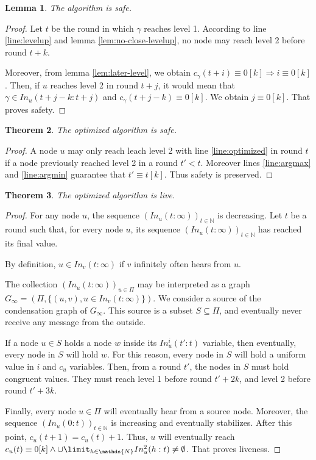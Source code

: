 \documentclass[11pt,letterpaper]{article}
\newtheorem{thm}{Theorem}
\newtheorem{lem}[thm]{Lemma}
\newcommand{\cent}{\gamma}
\begin{document}
\begin{lem}
	The algorithm is safe.
\end{lem}
\begin{proof}
	Let $t$ be the round in which $\cent$ reaches level 1.
	According to line \ref{line:levelup} and lemma \ref{lem:no-close-levelup}, no node may reach level 2 before round $t+k$.

	Moreover, from lemma \ref{lem:later-level}, we obtain $c_\cent(t+i) \equiv 0 [k] \Rightarrow i \equiv 0 [k]$.
	Then, if $u$ reaches level 2 in round $t+j$, it would mean that $\cent \in In_u(t+j-k:t+j)$ and $c_\cent(t+j-k) \equiv 0 [k]$.
	We obtain $j \equiv 0 [k]$. That proves safety.
\end{proof}

\begin{thm}
	The optimized algorithm is safe.
\end{thm}
\begin{proof}
	A node $u$ may only reach leach level 2 with line \ref{line:optimized} in round $t$ if a node previously reached level 2 in a round $t' < t$.
	Moreover lines \ref{line:argmax} and \ref{line:argmin} guarantee that $t' \equiv t [k]$.
	Thus safety is preserved.
\end{proof}

\begin{thm}
	The optimized algorithm is live.
\end{thm}
\begin{proof}
	For any node $u$, the sequence $(In_u(t:\infty))_{t \in \mathds{N}}$ is decreasing.
	Let $t$ be a round such that, for every node $u$, its sequence $(In_u(t:\infty))_{t \in \mathds{N}}$ has reached its final value.

	By definition, $u \in In_v(t:\infty)$ if $v$ infinitely often hears from $u$.

	The collection $(In_u(t:\infty))_{u \in \Pi}$ may be interpreted as a graph $G_\infty = (\Pi, \{(u,v), u \in In_v(t:\infty)\})$.
	We consider a source of the condensation graph of $G_\infty$.
	This source is a subset $S \subseteq \Pi$, and eventually never receive any message from the outside.

	If a node $u \in S$ holds a node $w$ inside its $In_u^i(t':t)$ variable, then eventually, every node in $S$ will hold $w$.
	For this reason, every node in $S$ will hold a uniform value in $i$ and $c_u$ variables.
	Then, from a round $t'$, the nodes in $S$ must hold congruent values.
	They must reach level 1 before round $t'+2k$, and level 2 before round $t'+3k$.

	Finally, every node $u \in \Pi$ will eventually hear from a source node.
	Moreover, the sequence $(In_u(0:t))_{t \in \mathds{N}}$ is increasing and eventually stabilizes.
	After this point, $c_u(t+1) = c_u(t)+1$.
	Thus, $u$ will eventually reach $c_u(t) \equiv 0 [k] \wedge \cup\limit_{h \in \mathds{N}} In_u^2(h:t) \neq \emptyset$.
	That proves liveness.
\end{proof}
\end{document}
